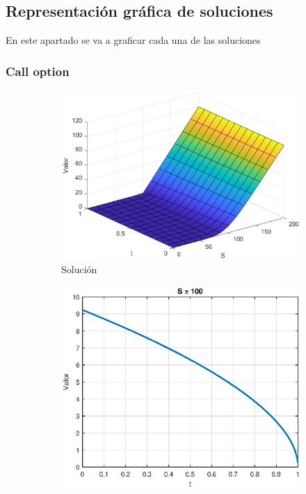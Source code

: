 \subsection{Representación gráfica de soluciones}
En este apartado se va a graficar cada una de las soluciones
\subsubsection{Call option}
\begin{figure}[H]
    \centering
    \begin{subfigure}[b]{0.35\linewidth}
        \includegraphics[width=\linewidth]{Imagenes/6_Sols/Call/Call3D.eps}
        \caption{Solución}
    \end{subfigure}
    \begin{subfigure}[b]{0.35\linewidth}
        \includegraphics[width=\linewidth]{Imagenes/6_Sols/Call/CallSFijo.eps}

\end{subfigure}
\end{figure}
